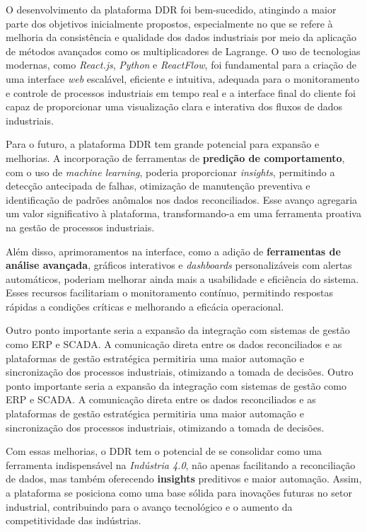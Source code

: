 \label{Cap:ConsideracoesFinais}

O desenvolvimento da plataforma DDR foi bem-sucedido, atingindo a maior parte dos objetivos inicialmente propostos, especialmente no que se refere à melhoria da consistência e qualidade dos dados industriais por meio da aplicação de métodos avançados como os multiplicadores de Lagrange. O uso de tecnologias modernas, como \textit{React.js}, \textit{Python} e \textit{ReactFlow}, foi fundamental para a criação de uma interface \textit{web} escalável, eficiente e intuitiva, adequada para o monitoramento e controle de processos industriais em tempo real e a interface final do cliente foi capaz de proporcionar uma visualização clara e interativa dos fluxos de dados industriais.

Para o futuro, a plataforma DDR tem grande potencial para expansão e melhorias. A incorporação de ferramentas de \textbf{predição de comportamento}, com o uso de \textit{machine learning}, poderia proporcionar \textit{insights}, permitindo a detecção antecipada de falhas, otimização de manutenção preventiva e identificação de padrões anômalos nos dados reconciliados. Esse avanço agregaria um valor significativo à plataforma, transformando-a em uma ferramenta proativa na gestão de processos industriais.

Além disso, aprimoramentos na interface, como a adição de \textbf{ferramentas de análise avançada}, gráficos interativos e \textit{dashboards} personalizáveis com alertas automáticos, poderiam melhorar ainda mais a usabilidade e eficiência do sistema. Esses recursos facilitariam o monitoramento contínuo, permitindo respostas rápidas a condições críticas e melhorando a eficácia operacional.

Outro ponto importante seria a expansão da integração com sistemas de gestão como ERP e SCADA. A comunicação direta entre os dados reconciliados e as plataformas de gestão estratégica permitiria uma maior automação e sincronização dos processos industriais, otimizando a tomada de decisões.
Outro ponto importante seria a expansão da integração com sistemas de gestão como ERP e SCADA. A comunicação direta entre os dados reconciliados e as plataformas de gestão estratégica permitiria uma maior automação e sincronização dos processos industriais, otimizando a tomada de decisões.

Com essas melhorias, o DDR tem o potencial de se consolidar como uma ferramenta indispensável na \textit{Indústria 4.0}, não apenas facilitando a reconciliação de dados, mas também oferecendo \textbf{insights} preditivos e maior automação. Assim, a plataforma se posiciona como uma base sólida para inovações futuras no setor industrial, contribuindo para o avanço tecnológico e o aumento da competitividade das indústrias.